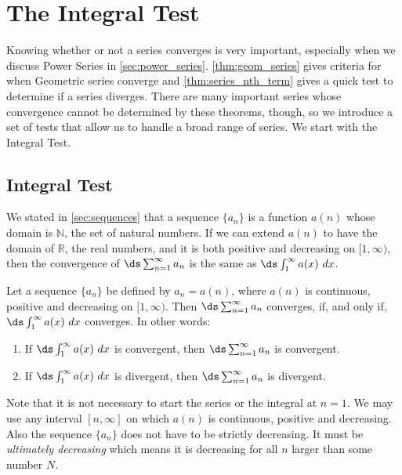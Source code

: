\section{The Integral Test}\label{sec:int_tests}

Knowing whether or not a series converges is very important, especially when we discuss Power Series in \autoref{sec:power_series}. \autoref{thm:geom_series} gives criteria for when Geometric series converge and \autoref{thm:series_nth_term} gives a quick test to determine if a series diverges. There are many important series whose convergence cannot be determined by these theorems, though, so we introduce a set of tests that allow us to handle a broad range of series. We start with the Integral Test.


\subsection{Integral Test}

We stated in \autoref{sec:sequences} that a sequence $\{a_n\}$ is a function $a(n)$ whose domain is $\mathbb{N}$, the set of natural numbers. If we can extend $a(n)$ to have the domain of $\mathbb{R}$, the real numbers, and it is both positive and decreasing on $[1,\infty)$, then the convergence of $\ds \sum_{n=1}^\infty a_n$ is the same as $\ds\int_1^\infty a(x)\ dx$. 

{Let a sequence $\{a_n\}$ be defined by $a_n=a(n)$, where $a(n)$ is continuous, positive and decreasing on $[1,\infty)$. Then $\ds \sum_{n=1}^\infty a_n$ converges, if, and only if, $\ds\int_1^\infty a(x)\ dx$ converges. In other words:
\begin{enumerate}
\item If $\ds \int_1^\infty a(x)\ dx$ is convergent, then $\ds \sum_{n=1}^\infty a_n$ is convergent.
\item If $\ds \int_1^\infty a(x)\ dx$ is divergent, then $\ds \sum_{n=1}^\infty a_n$ is divergent.
\end{enumerate}
}

Note that it is not necessary to start the series or the integral at $n=1$. We may use any interval $[n,\infty]$ on which $a(n)$ is continuous, positive and decreasing. Also the sequence $\{a_n\}$ does not have to be strictly decreasing. It must be \textit{ultimately decreasing} which means it is decreasing for all $n$ larger than some number $N$.\bigskip



